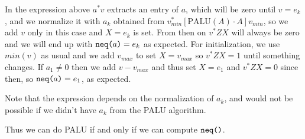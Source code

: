 In the expression above $a^*v$ extracts an entry of $a$, which will be zero until $v=e_k$, and we normalize it with $a_k$ obtained from $v_{min}^*\left[\text{PALU}(A)\cdot A\right]v_{min}$, so we add $v$ only in this case and $X=e_k$ is set. From then on $v^*ZX$ will always be zero and we will end up with $\texttt{neq(}a\texttt{)}=e_k$ as expected. For initialization, we use $min(v)$ as usual and we add $v_{max}$ to set $X=v_{max}$ so $v^*ZX=1$ until something changes. If $a_1\neq 0$ then we add $v-v_{max}$ and thus set $X=e_1$ and $v^*ZX=0$ since then, so $\texttt{neq(}a\texttt{)}=e_1$, as expected.

Note that the expression depends on the normalization of $a_k$, and would not be possible if we didn't have $a_k$ from the PALU algorithm.

Thus we can do PALU if and only if we can compute $\nneq$.
